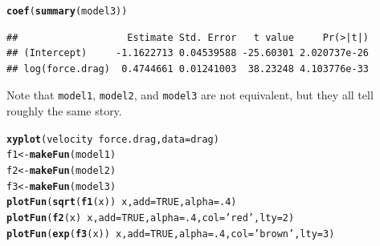 \documentclass[twoside]{book}\usepackage[]{graphicx}\usepackage[]{xcolor}
\makeatletter
\newcommand{\hlnum}[1]{\textcolor[rgb]{0.686,0.059,0.569}{#1}}%
\newcommand{\hlstr}[1]{\textcolor[rgb]{0.192,0.494,0.8}{#1}}%
\newcommand{\hlopt}[1]{\textcolor[rgb]{0,0,0}{#1}}%
\newcommand{\hlstd}[1]{\textcolor[rgb]{0.345,0.345,0.345}{#1}}%
\newcommand{\hlkwb}[1]{\textcolor[rgb]{0.69,0.353,0.396}{#1}}%
\newcommand{\hlkwc}[1]{\textcolor[rgb]{0.333,0.667,0.333}{#1}}%
\newcommand{\hlkwd}[1]{\textcolor[rgb]{0.737,0.353,0.396}{\textbf{#1}}}%
\newenvironment{kframe}{%
 \def\at@end@of@kframe{}%
 \ifinner\ifhmode%
  \def\at@end@of@kframe{\end{minipage}}%
  \begin{minipage}{\columnwidth}%
 \fi\fi%
 \def\FrameCommand##1{\hskip\@totalleftmargin \hskip-\fboxsep
 \colorbox{shadecolor}{##1}\hskip-\fboxsep
     \hskip-\linewidth \hskip-\@totalleftmargin \hskip\columnwidth}%
 \MakeFramed {\advance\hsize-\width
   \@totalleftmargin\z@ \linewidth\hsize
   \@setminipage}}%
 {\par\unskip\endMakeFramed%
 \at@end@of@kframe}
\newenvironment{knitrout}{}{} %
\makeatother
\begin{document}
\begin{solution}
\begin{knitrout}
\begin{kframe}
\begin{alltt}
\hlkwd{coef}\hlstd{(}\hlkwd{summary}\hlstd{(model3))}
\end{alltt}
\begin{verbatim}
##                   Estimate Std. Error   t value     Pr(>|t|)
## (Intercept)     -1.1622713 0.04539588 -25.60301 2.020737e-26
## log(force.drag)  0.4744661 0.01241003  38.23248 4.103776e-33
\end{verbatim}
\end{kframe}
\end{knitrout}
Note that \verb!model1!, \verb!model2!, and \verb!model3! are not equivalent, 
but they all tell roughly the same story.
\begin{knitrout}
\color{fgcolor}\begin{kframe}
\begin{alltt}
\hlkwd{xyplot}\hlstd{( velocity} \hlopt{~} \hlstd{force.drag,} \hlkwc{data}\hlstd{=drag)}
\hlstd{f1} \hlkwb{<-} \hlkwd{makeFun}\hlstd{(model1)}
\hlstd{f2} \hlkwb{<-} \hlkwd{makeFun}\hlstd{(model2)}
\hlstd{f3} \hlkwb{<-} \hlkwd{makeFun}\hlstd{(model3)}
\hlkwd{plotFun}\hlstd{(} \hlkwd{sqrt}\hlstd{(}\hlkwd{f1}\hlstd{(x))} \hlopt{~} \hlstd{x,} \hlkwc{add}\hlstd{=}\hlnum{TRUE}\hlstd{,} \hlkwc{alpha}\hlstd{=}\hlnum{.4} \hlstd{)}
\hlkwd{plotFun}\hlstd{(} \hlkwd{f2}\hlstd{(x)} \hlopt{~} \hlstd{x,} \hlkwc{add}\hlstd{=}\hlnum{TRUE}\hlstd{,} \hlkwc{alpha}\hlstd{=}\hlnum{.4}\hlstd{,} \hlkwc{col}\hlstd{=}\hlstr{'red'}\hlstd{,} \hlkwc{lty}\hlstd{=}\hlnum{2} \hlstd{)}
\hlkwd{plotFun}\hlstd{(} \hlkwd{exp}\hlstd{(}\hlkwd{f3}\hlstd{(x))} \hlopt{~} \hlstd{x,} \hlkwc{add}\hlstd{=}\hlnum{TRUE}\hlstd{,} \hlkwc{alpha}\hlstd{=}\hlnum{.4}\hlstd{,} \hlkwc{col}\hlstd{=}\hlstr{'brown'}\hlstd{,} \hlkwc{lty}\hlstd{=}\hlnum{3} \hlstd{)}
\end{alltt}
\end{kframe}


\end{knitrout}
\end{solution}
\end{document}
